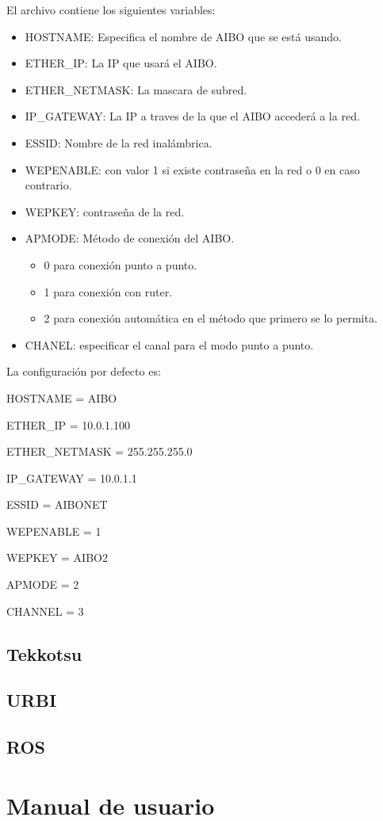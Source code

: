\documentclass[12pt,a4paper,final,twoside]{article}
\begin{document}
El archivo contiene los siguientes variables:
\begin{itemize}
\item HOSTNAME: Especifica el nombre de AIBO que se está usando.
\item ETHER{\_}IP: La IP que usará el AIBO.
\item ETHER{\_}NETMASK: La mascara de subred.
\item IP{\_}GATEWAY: La IP a traves de la que el AIBO accederá a la red.
\item ESSID: Nombre de la red inalámbrica.
\item WEPENABLE: con valor 1 si existe contraseña en la red o 0 en caso contrario.
\item WEPKEY: contraseña de la red.
\item APMODE: Método de conexión del AIBO.
\begin{itemize}
\item 0 para conexión punto a punto.
\item 1 para conexión con ruter.
\item 2 para conexión automática en el método que primero se lo permita.
\end{itemize}
\item CHANEL: especificar el canal para el modo punto a punto.
\end{itemize}
La configuración por defecto es:

HOSTNAME = AIBO

ETHER{\_}IP = 10.0.1.100

ETHER{\_}NETMASK = 255.255.255.0

IP{\_}GATEWAY = 10.0.1.1

ESSID = AIBONET

WEPENABLE = 1

WEPKEY = AIBO2

APMODE = 2

CHANNEL = 3 
\subsection{Tekkotsu}
\subsection{URBI}
\subsection{ROS}

\newpage

\section{Manual de usuario}
\end{document}
